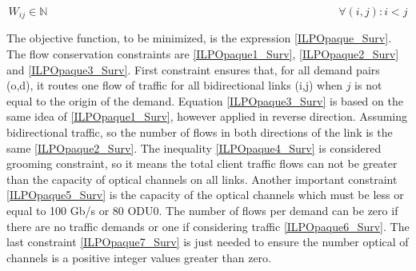 \begin{equation}
W_{ij} \in \mathbb{N}  \qquad \qquad \qquad \qquad \qquad \qquad \qquad \qquad \qquad \qquad \qquad \qquad \qquad
\forall(i,j) : i < j
\label{ILPOpaque7_Surv}
\end{equation}

\vspace{10pt}

The objective function, to be minimized, is the expression \ref{ILPOpaque_Surv}. The flow conservation constraints are \ref{ILPOpaque1_Surv}, \ref{ILPOpaque2_Surv} and \ref{ILPOpaque3_Surv}. First constraint ensures that, for all demand pairs (o,d), it routes one flow of traffic for all bidirectional links (i,j) when $j$ is not equal to the origin of the demand. Equation \ref{ILPOpaque3_Surv} is based on the same idea of \ref{ILPOpaque1_Surv}, however applied in reverse direction. Assuming bidirectional traffic, so the number of flows in both directions of the link is the same \ref{ILPOpaque2_Surv}. The inequality \ref{ILPOpaque4_Surv} is considered grooming constraint, so it means the total client traffic flows can not be greater than the capacity of optical channels on all links. Another important constraint \ref{ILPOpaque5_Surv} is the capacity of the optical channels which must be less or equal to 100 Gb/s or 80 ODU0. The number of flows per demand can be zero if there are no traffic demands or one if considering traffic \ref{ILPOpaque6_Surv}. The last constraint \ref{ILPOpaque7_Surv} is just needed to ensure the number optical of channels is a positive integer values greater than zero.\\

